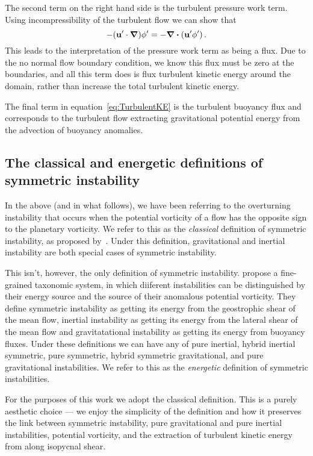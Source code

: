     The second term on the right hand side is the turbulent pressure work term. Using incompressibility of the turbulent flow we can show that
    \begin{equation}
       - (\mathbf{u}'\cdot \grad) \phi ' = - \div{(\mathbf{u'}\phi ')} \, .
    \end{equation}
    This leads to the interpretation of the pressure work term as being a flux. Due to the no normal flow boundary condition, we know this flux must be zero at the boundaries, and all this term does is flux turbulent kinetic energy around the domain, rather than increase the total turbulent kinetic energy.
    
    The final term in equation~\ref{eq:TurbulentKE} is the turbulent buoyancy flux and corresponds to the turbulent flow extracting gravitational potential energy from the advection of buoyancy anomalies.

    \subsection{The classical and energetic definitions of symmetric instability}
    In the above (and in what follows), we have been referring to the overturning instability that occurs when the potential vorticity of a flow has the opposite sign to the planetary vorticity. We refer to this as the \textit{classical} definition of symmetric instability, as proposed by~\citet{Hoskins1974}. Under this definition, gravitational and inertial instability are both special cases of symmetric instability. 
    
    This isn't, however, the only definition of symmetric instability. \citet{Thomas2013} propose a fine-grained taxonomic system, in which diiferent instabilities can be distinguished by their energy source and the source of their anomalous potential vorticity. They define symmetric instability as getting its energy from the geostrophic shear of the mean flow, inertial instability as getting its energy from the lateral shear of the mean flow and gravitatational instability as getting its energy from buoyancy fluxes. Under these definitions we can have any of pure inertial, hybrid inertial symmetric, pure symmetric, hybrid symmetric gravitational, and pure gravitational instabilities. We refer to this as the \textit{energetic} definition of symmetric instabilities.

    For the purposes of this work we adopt the classical definition. This is a purely aesthetic choice --- we enjoy the simplicity of the definition and how it preserves the link between symmetric instability, pure gravitational and pure inertial instabilities, potential vorticity, and the extraction of turbulent kinetic energy from along isopycnal shear.

